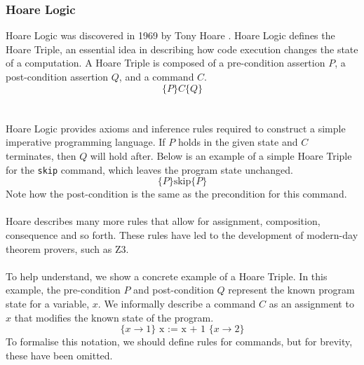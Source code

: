 \subsubsection{Hoare Logic}
Hoare Logic was discovered in 1969 by Tony Hoare \cite{hoare_logic}. Hoare Logic defines the Hoare Triple, an essential idea in describing how code execution changes the state of a computation. A Hoare Triple is composed of a pre-condition assertion $P$, a post-condition assertion $Q$, and a command $C$.
\[
\{P\} C \{Q\}
\]
\\ \\
Hoare Logic provides axioms and inference rules required to construct a simple imperative programming language. If $P$ holds in the given state and $C$ terminates, then $Q$ will hold after. Below is an example of a simple Hoare Triple for the \texttt{skip} command, which leaves the program state unchanged.
\[
    \{P\} \text{skip} \{P\}
\]
Note how the post-condition is the same as the precondition for this command.
\\ \\
Hoare describes many more rules that allow for assignment, composition, consequence and so forth. These rules have led to the development of modern-day theorem provers, such as Z3.
\\ \\
To help understand, we show a concrete example of a Hoare Triple. In this example, the pre-condition $P$ and post-condition $Q$ represent the known program state for a variable, $x$. We informally describe a command $C$ as an assignment to $x$ that modifies the known state of the program.
\[
\{ x \rightarrow 1 \} \text{ x := x + 1 } \{ x \rightarrow 2 \}
\]
To formalise this notation, we should define rules for commands, but for brevity, these have been omitted.

